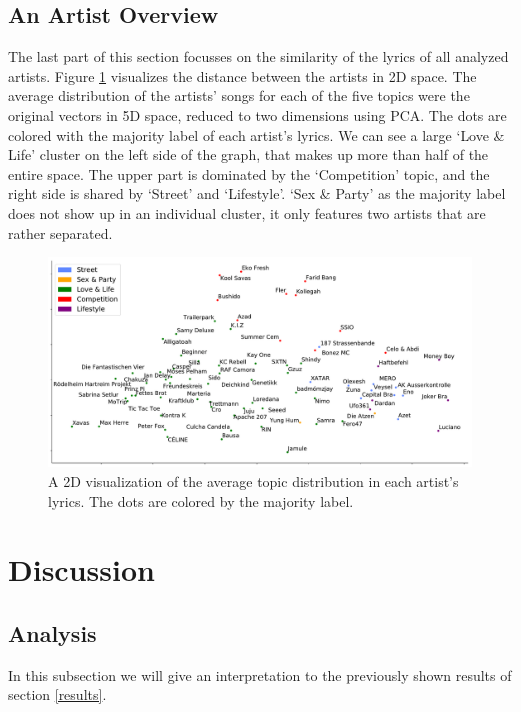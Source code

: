 \documentclass[conference]{IEEEtran}
\begin{document}
\subsection{An Artist Overview}
The last part of this section focusses on the similarity of the lyrics of all analyzed artists. Figure \ref{fig:scatter} visualizes the distance between the artists in 2D space. The average distribution of the artists' songs for each of the five topics were the original vectors in 5D space, reduced to two dimensions using PCA. The dots are colored with the majority label of each artist's lyrics. We can see a large {\lq}Love \& Life{\rq} cluster on the left side of the graph, that makes up more than half of the entire space. The upper part is dominated by the {\lq}Competition{\rq} topic, and the right side is shared by {\lq}Street{\rq} and {\lq}Lifestyle{\rq}. {\lq}Sex \& Party{\rq} as the majority label does not show up in an individual cluster, it only features two artists that are rather separated.

\begin{figure}[!t]
\includegraphics[width=\linewidth]{figures/scatter.pdf}
\vspace*{-8mm}
\caption{A 2D visualization of the average topic distribution in each artist's lyrics. The dots are colored by the majority label.}
\label{fig:scatter}
\end{figure}

\section{Discussion}
\subsection{Analysis}
In this subsection we will give an interpretation to the previously shown results of section \ref{results}.
\end{document}
